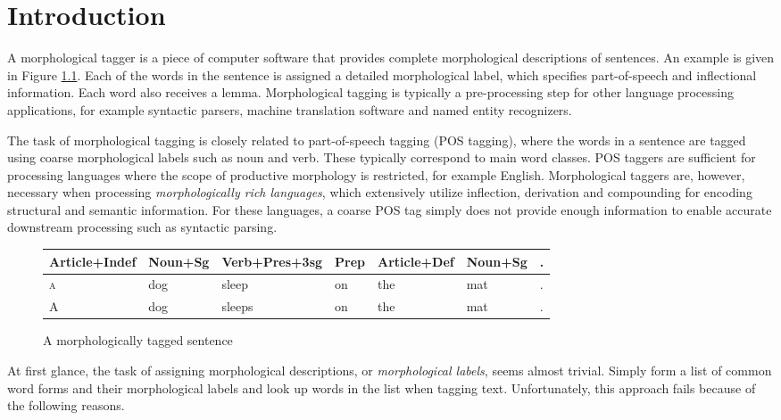 \chapter{Introduction}
\label{ch:intro}

A morphological tagger is a piece of computer software that provides
complete morphological descriptions of sentences. An example is given
in Figure \ref{fig:mt-example}. Each of the words in the sentence is
assigned a detailed morphological label, which specifies
part-of-speech and inflectional information. Each word also receives a
lemma. Morphological tagging is typically a pre-processing step for
other language processing applications, for example syntactic parsers,
machine translation software and named entity recognizers.

The task of morphological tagging is closely related to part-of-speech
tagging (POS tagging), where the words in a sentence are tagged using
coarse morphological labels such as noun and verb. These typically
correspond to main word classes. POS taggers are sufficient for
processing languages where the scope of productive morphology is
restricted, for example English. Morphological taggers are, however,
necessary when processing {\it morphologically rich languages}, which
extensively utilize inflection, derivation and compounding for
encoding structural and semantic information. For these languages, a
coarse POS tag simply does not provide enough information to enable
accurate downstream processing such as syntactic parsing.

\begin{figure}[!htb]
\begin{center}
\begin{tabular}{|l|l|l|l|l|l|l|}
\hline
Article+Indef & Noun+Sg & Verb+Pres+3sg & Prep & Article+Def & Noun+Sg & .\\  
\hline
\textsc{a} & dog & sleep & on & the & mat & .\\
\hline
A & dog & sleeps & on & the & mat & .\\
\hline
\end{tabular}
\end{center}
\caption{A morphologically tagged sentence}\label{fig:mt-example}
\end{figure}

At first glance, the task of assigning morphological descriptions, or
{\it morphological labels}, seems almost trivial. Simply form a list of
common word forms and their morphological labels and look up words in
the list when tagging text. Unfortunately, this approach
fails because of the following reasons.

